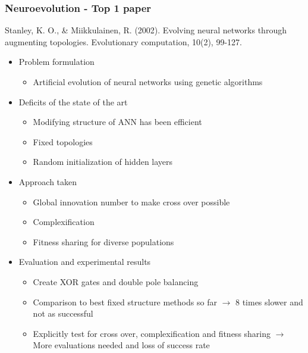 \documentclass[8pt]{beamer}
\begin{document}
\begin{frame}
\frametitle{Neuroevolution - Top 1 paper}
Stanley, K. O., \& Miikkulainen, R. (2002). Evolving neural networks through augmenting topologies. Evolutionary computation, 10(2), 99-127.
\begin{itemize}
	\item Problem formulation
	\begin{itemize}
		\item Artificial evolution of neural networks using genetic algorithms
	\end{itemize}
	\item Deficits of the state of the art
	\begin{itemize}
		\item Modifying structure of ANN has been efficient
		\item Fixed topologies
		\item Random initialization of hidden layers
	\end{itemize}		 
	\item Approach taken
	\begin{itemize}
		\item Global innovation number to make cross over possible
		\item Complexification 
		\item Fitness sharing for diverse populations
	\end{itemize}
	\item Evaluation and experimental results
	\begin{itemize}
		\item Create XOR gates and double pole balancing
		\item Comparison to best fixed structure methods so far $\rightarrow$ 8 times slower and not as successful
		\item Explicitly test for cross over, complexification and fitness sharing $\rightarrow$ More evaluations needed and loss of success rate
	\end{itemize}
\end{itemize}
\end{frame}
\end{document}
